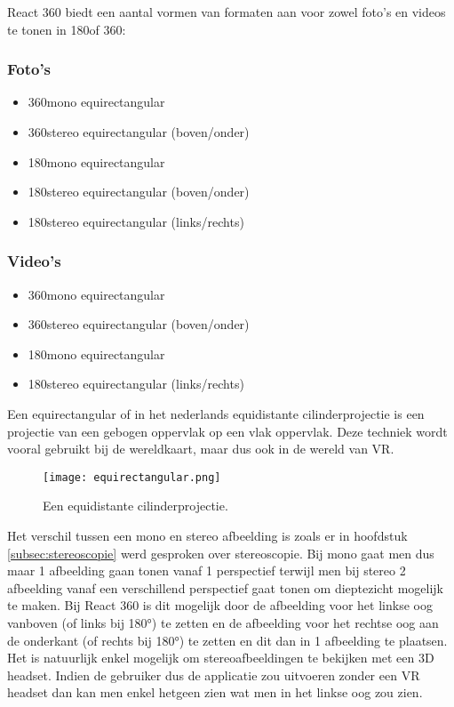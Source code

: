 React 360 biedt een aantal vormen van formaten aan voor zowel foto's en videos te tonen in 180\textdegree of 360\textdegree:

\subsubsection{Foto's}
\begin{itemize}
	\item 360\textdegree mono equirectangular
	\item 360\textdegree stereo equirectangular (boven/onder)
	\item 180\textdegree mono equirectangular
	\item 180\textdegree stereo equirectangular (boven/onder)
	\item 180\textdegree stereo equirectangular (links/rechts)
\end{itemize}

\subsubsection{Video's}
\begin{itemize}
	\item 360\textdegree mono equirectangular
	\item 360\textdegree stereo equirectangular (boven/onder)
	\item 180\textdegree mono equirectangular
	\item 180\textdegree stereo equirectangular (links/rechts)
\end{itemize}

Een equirectangular of in het nederlands equidistante cilinderprojectie is een projectie van een gebogen oppervlak op een vlak oppervlak. Deze techniek wordt vooral gebruikt bij de wereldkaart, maar dus ook in de wereld van VR. 

\begin{figure}
	\centering
	\texttt{[image: equirectangular.png]}
	\caption{Een equidistante cilinderprojectie.}
	\label{fig:eq-cilinder}
\end{figure}

Het verschil tussen een mono en stereo afbeelding is zoals er in hoofdstuk \ref{subsec:stereoscopie} werd gesproken over stereoscopie. Bij mono gaat men dus maar 1 afbeelding gaan tonen vanaf 1 perspectief terwijl men bij stereo 2 afbeelding vanaf een verschillend perspectief gaat tonen om dieptezicht mogelijk te maken. Bij React 360 is dit mogelijk door de afbeelding voor het linkse oog vanboven (of links bij 180°) te zetten en de afbeelding voor het rechtse oog aan de onderkant (of rechts bij 180°) te zetten en dit dan in 1 afbeelding te plaatsen. Het is natuurlijk enkel mogelijk om stereoafbeeldingen te bekijken met een 3D headset. Indien de gebruiker dus de applicatie zou uitvoeren zonder een VR headset dan kan men enkel hetgeen zien wat men in het linkse oog zou zien.

